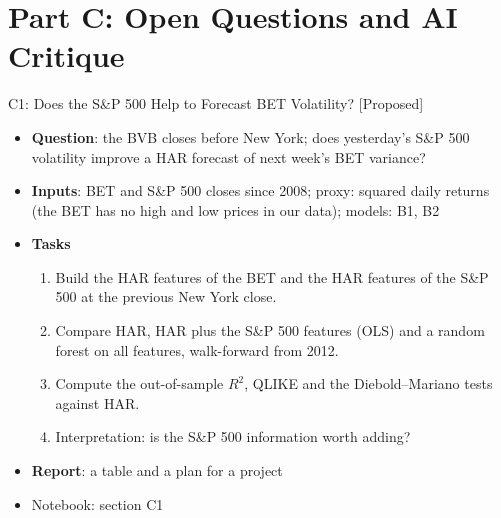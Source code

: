 \section{Part C: Open Questions and AI Critique}

\begin{frame}{C1: Does the S\&P 500 Help to Forecast BET Volatility? [Proposed]}
\itemsize{\footnotesize}
\begin{itemize}
\item \textbf{Question}: the BVB closes before New York; does yesterday's S\&P 500 volatility improve a HAR forecast of next week's BET variance?
\item \textbf{Inputs}: BET and S\&P 500 closes since 2008; proxy: squared daily returns (the BET has no high and low prices in our data); models: B1, B2
\item \textbf{Tasks}
\begin{enumerate}
    \item Build the HAR features of the BET and the HAR features of the S\&P 500 at the previous New York close.
    \item Compare HAR, HAR plus the S\&P 500 features (OLS) and a random forest on all features, walk-forward from 2012.
    \item Compute the out-of-sample $R^2$, QLIKE and the Diebold--Mariano tests against HAR.
    \item Interpretation: is the S\&P 500 information worth adding?
\end{enumerate}
\item \textbf{Report}: a table and a plan for a project
\item Notebook: section C1
\end{itemize}
\end{frame}

